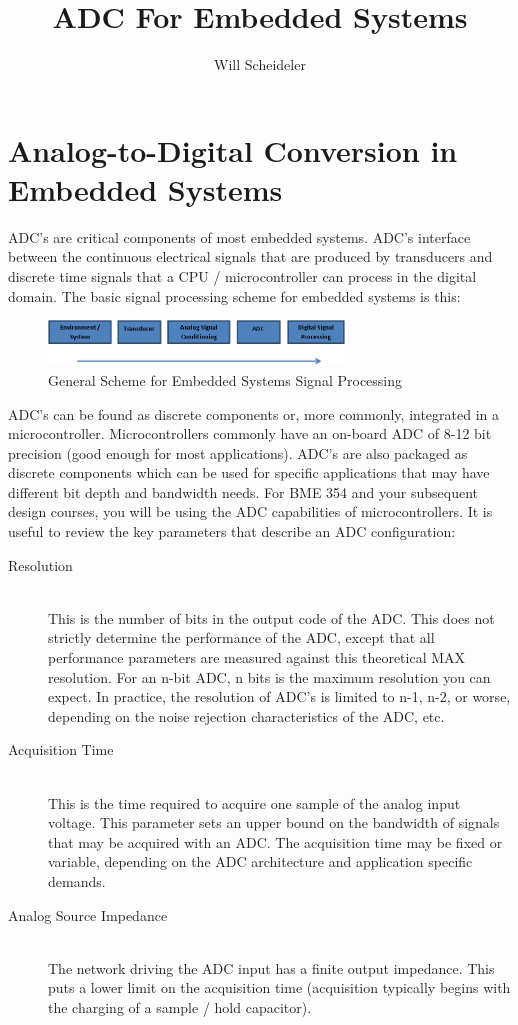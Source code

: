 \documentclass[10pt]{report}
\title{ADC For Embedded Systems}
\author{Will Scheideler}
\begin{document}
\section*{Analog-to-Digital Conversion in Embedded Systems}

\par
	ADC’s are critical components of most embedded systems. ADC’s interface between the continuous electrical signals that are produced by transducers and discrete time signals that a CPU / microcontroller can process in the digital domain. The basic signal processing scheme for embedded systems is this: 

\begin{figure}[H]
\centering
   \includegraphics[width=0.7\textwidth]{ADC_1.png}
    \caption{General Scheme for Embedded Systems Signal Processing}
\end{figure}

\par
ADC’s can be found as discrete components or, more commonly, integrated in a microcontroller. Microcontrollers commonly have an on-board ADC of 8-12 bit precision (good enough for most applications). ADC’s are also packaged as discrete components which can be used for specific applications that may have different bit depth and bandwidth needs. For BME 354 and your subsequent design courses, you will be using the ADC capabilities of microcontrollers. It is useful to review the key parameters that describe an ADC configuration:

\begin{description}
  \item[Resolution] \hfill \\
  This is the number of bits in the output code of the ADC. This does not strictly determine the performance of the ADC, except that all performance parameters are measured against this theoretical MAX resolution. For an n-bit ADC, n bits is the maximum resolution you can expect. In practice, the resolution of ADC’s is limited to n-1, n-2, or worse, depending on the noise rejection characteristics of the ADC, etc.

  \item[Acquisition Time] \hfill \\
This is the time required to acquire one sample of the analog input voltage. This parameter sets an upper bound on the bandwidth of signals that may be acquired with an ADC. The acquisition time may be fixed or variable, depending on the ADC architecture and application specific demands.

  \item[Analog Source Impedance] \hfill \\
  The network driving the ADC input has a finite output impedance. This puts a lower limit on the acquisition time (acquisition typically begins with the charging of a sample / hold capacitor).
\end{description}
\end{document}
